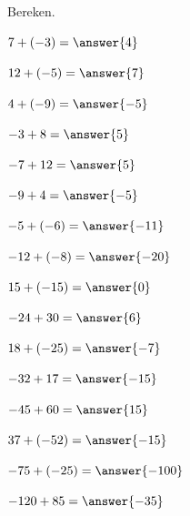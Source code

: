 \documentclass{ximera}
\begin{document}
\begin{oefening}{\oefB\ESS}

Bereken.

\begin{question} \(7+(-3)=\answer{4}\) \end{question}

\begin{question} \(12+(-5)=\answer{7}\) \end{question}

\begin{question} \(4+(-9)=\answer{-5}\) \end{question}

\begin{question} \(-3+8=\answer{5}\) \end{question}

\begin{question} \(-7+12=\answer{5}\) \end{question}

\begin{question} \(-9+4=\answer{-5}\) \end{question}

\begin{question} \(-5+(-6)=\answer{-11}\) \end{question}

\begin{question} \(-12+(-8)=\answer{-20}\) \end{question}

\begin{question} \(15+(-15)=\answer{0}\) \end{question}

\begin{question} \(-24+30=\answer{6}\) \end{question}

\begin{question} \(18+(-25)=\answer{-7}\) \end{question}

\begin{question} \(-32+17=\answer{-15}\) \end{question}

\begin{question} \(-45+60=\answer{15}\) \end{question}

\begin{question} \(37+(-52)=\answer{-15}\) \end{question}

\begin{question} \(-75+(-25)=\answer{-100}\) \end{question}

\begin{question} \(-120+85=\answer{-35}\) \end{question}

\end{oefening}
\end{document}
